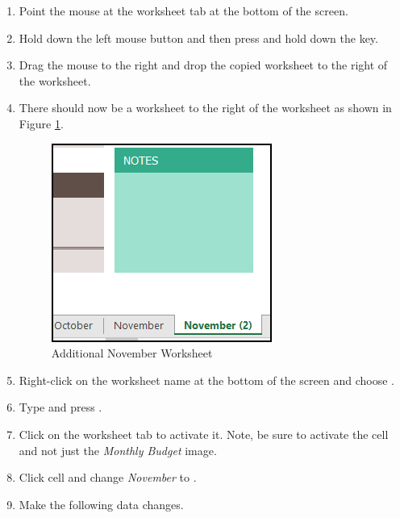 \begin{enumbox}
	\begin{enumerate}
		\item Point the mouse at the  worksheet tab at the bottom of the screen.
		\item Hold down the left mouse button and then press and hold down the  key. 
		\item Drag the mouse to the right and drop the copied worksheet to the right of the  worksheet.
		\item There should now be a  worksheet to the right of the  worksheet as shown in Figure \ref{06:fig02}.

		\begin{figure}[H]
			\centering
			\includegraphics[width=\maxwidth{.50\linewidth}]{gfx/ch06_fig02}
			\caption{Additional November Worksheet}
			\label{06:fig02}
		\end{figure}

		\item Right-click on the  worksheet name at the bottom of the screen and choose .
		\item Type  and press .
		\item Click on the  worksheet tab to activate it. Note, be sure to activate the cell and not just the \textit{Monthly Budget} image.
		\item Click cell  and change \textit{November} to .
		\item Make the following data changes.
	

\end{enumerate}
\end{enumbox}
